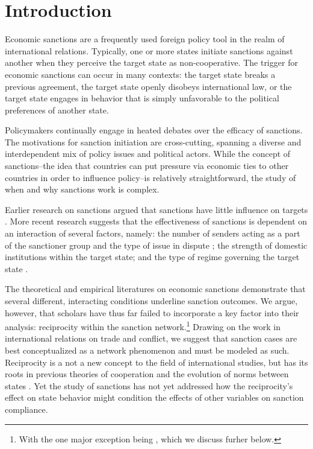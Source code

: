 \section*{Introduction}
\label{intro}

Economic sanctions are a frequently used foreign policy tool in the realm of international relations. Typically, one or more states initiate sanctions against another when they perceive the target state as non-cooperative. The trigger for economic sanctions can occur in many contexts: the target state breaks a previous agreement, the target state openly disobeys international law, or the target state engages in behavior that is simply unfavorable to the political preferences of another state. 

Policymakers continually engage in heated debates over the efficacy of sanctions. The motivations for sanction initiation are cross-cutting, spanning a diverse and interdependent mix of policy issues and political actors. While the concept of sanctions--the idea that countries can put pressure via economic ties to other countries in order to influence policy--is relatively straightforward, the study of when and why sanctions work is complex.

Earlier research on sanctions argued that sanctions have little influence on targets \citep{lam1990, dashti1997, morgan1997, drezner1998}. More recent research suggests that the effectiveness of sanctions is dependent on an interaction of several factors, namely: the number of senders acting as a part of the sanctioner group and the type of issue in dispute \citep{miers2002, morgan2009threat}; the strength of domestic institutions within the target state; and the type of regime governing the target state \citep{mcgillivray2004}. 

The theoretical and empirical literatures on economic sanctions demonstrate that several different, interacting conditions underline sanction outcomes. We argue, however, that scholars have thus far failed to incorporate a key factor into their analysis: reciprocity within the sanction network.\footnote{With the one major exception being \cite{cranmer2014reciprocity}, which we discuss furher below.} Drawing on the work in international relations on trade and conflict, we suggest that sanction cases are best conceptualized as a network phenomenon and must be modeled as such. Reciprocity is a not a new concept to the field of international studies, but has its roots in previous theories of cooperation and the evolution of norms between states \citep{richardsonai:1960,choucri:north:1972,goldstein1991reciprocity,rajmaira1990evolving,ward1992reciprocity}. Yet the study of sanctions has not yet addressed how the reciprocity's effect on state behavior might condition the effects of other variables on sanction compliance. 

